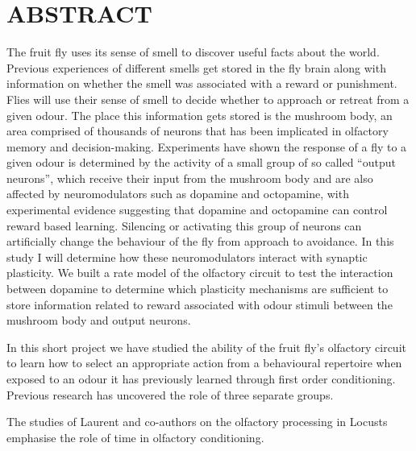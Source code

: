 \section{ABSTRACT}


The fruit fly uses its sense of smell to discover useful facts about the world. \iffalse Strange odours are populating the world everywhere, every being tries to smell it as the molecules propagate without end \fi  Previous experiences of different smells get stored in
the fly brain along with information on whether the smell was associated
with a reward or punishment. \iffalse Reward or punishment, as if this is the be all end all of everything. It's not we don't think in binary, things don't exist in only two states above the scale of quanta. \fi Flies will use their sense of smell to
decide whether to approach or retreat from a given odour. The place
this information gets stored is the mushroom body, an area comprised
of thousands of neurons that has been implicated in olfactory memory
and decision-making. Experiments have shown the response of a fly
to a given odour is determined by the activity of a small group of
so called \textquotedblleft output neurons\textquotedblright , which
receive their input from the mushroom body and are also affected by
neuromodulators such as dopamine and octopamine, with experimental
evidence suggesting that dopamine and octopamine can control reward
based learning. Silencing or activating this group of neurons can
artificially change the behaviour of the fly from approach to avoidance.
In this study I will determine how these neuromodulators interact
with synaptic plasticity. We built a rate model of the olfactory circuit to test the interaction between dopamine to determine which plasticity mechanisms are sufficient to store information related to reward associated with odour stimuli between the mushroom body and output neurons.

In this short project we have studied the ability of the fruit fly's olfactory circuit to learn how to select an appropriate action from a behavioural repertoire when exposed to an odour it has previously learned through first order conditioning. Previous research has uncovered the role of three separate groups. 

The studies of Laurent and co-authors on the olfactory processing in Locusts \cite{25864636}   emphasise the role of time in olfactory conditioning. 
  
  
  
  
  
  
  
 
  
  
  
  